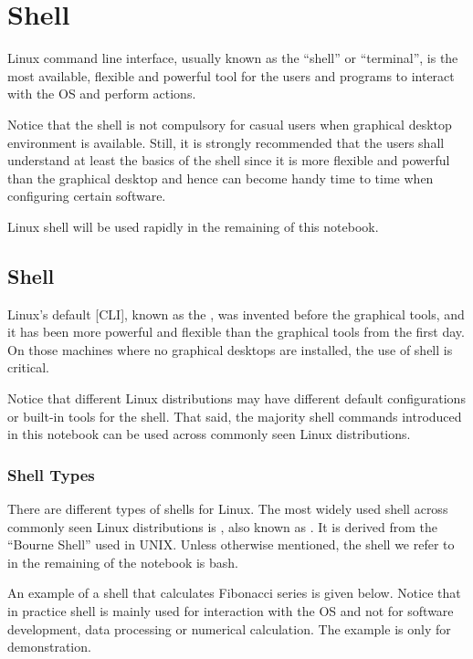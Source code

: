 \chapter{Shell} \label{ch:sb}

Linux command line interface, usually known as the ``shell'' or ``terminal'', is the most available, flexible and powerful tool for the users and programs to interact with the OS and perform actions.

Notice that the shell is not compulsory for casual users when graphical desktop environment is available. Still, it is strongly recommended that the users shall understand at least the basics of the shell since it is more flexible and powerful than the graphical desktop and hence can become handy time to time when configuring certain software.

Linux shell will be used rapidly in the remaining of this notebook.

\section{Shell}

Linux's default [CLI], known as the , was invented before the graphical tools, and it has been more powerful and flexible than the graphical tools from the first day. On those machines where no graphical desktops are installed, the use of shell is critical.

Notice that different Linux distributions may have different default configurations or built-in tools for the shell. That said, the majority shell commands introduced in this notebook can be used across commonly seen Linux distributions.

\subsection{Shell Types}

There are different types of shells for Linux. The most widely used shell across commonly seen Linux distributions is , also known as . It is derived from the ``Bourne Shell'' used in UNIX. Unless otherwise mentioned, the shell we refer to in the remaining of the notebook is bash. 

An example of a shell that calculates Fibonacci series is given below. Notice that in practice shell is mainly used for interaction with the OS and not for software development, data processing or numerical calculation. The example is only for demonstration.

